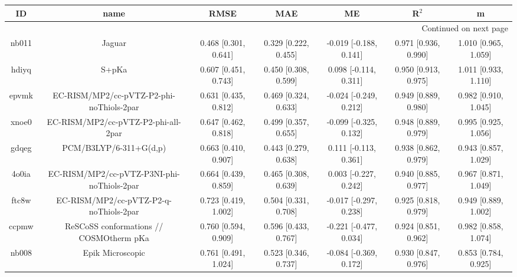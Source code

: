 \documentclass{article}
\begin{document}
\begin{center}
\begin{longtable}{|ccccccc|}
\toprule
    ID &                                               name &                  RMSE &                   MAE &                       ME &                 R$^2$ &                      m \\
\midrule
\endhead
\midrule
\multicolumn{7}{r}{{Continued on next page}} \\
\midrule
\endfoot

\bottomrule
\endlastfoot
 nb011 &                                             Jaguar &  0.468 [0.301, 0.641] &  0.329 [0.222, 0.455] &   -0.019 [-0.188, 0.141] &  0.971 [0.936, 0.990] &   1.010 [0.965, 1.059] \\
 hdiyq &                                              S+pKa &  0.607 [0.451, 0.743] &  0.450 [0.308, 0.599] &    0.098 [-0.114, 0.311] &  0.950 [0.913, 0.975] &   1.011 [0.933, 1.110] \\
 epvmk &           EC-RISM/MP2/cc-pVTZ-P2-phi-noThiols-2par &  0.631 [0.435, 0.812] &  0.469 [0.324, 0.633] &   -0.024 [-0.249, 0.212] &  0.949 [0.889, 0.980] &   0.982 [0.910, 1.045] \\
 xnoe0 &                EC-RISM/MP2/cc-pVTZ-P2-phi-all-2par &  0.647 [0.462, 0.818] &  0.499 [0.357, 0.655] &   -0.099 [-0.325, 0.132] &  0.948 [0.889, 0.979] &   0.995 [0.925, 1.056] \\
 gdqeg &                             PCM/B3LYP/6-311+G(d,p) &  0.663 [0.410, 0.907] &  0.443 [0.279, 0.638] &    0.111 [-0.113, 0.361] &  0.938 [0.862, 0.979] &   0.943 [0.857, 1.029] \\
 4o0ia &         EC-RISM/MP2/cc-pVTZ-P3NI-phi-noThiols-2par &  0.664 [0.439, 0.859] &  0.465 [0.308, 0.639] &    0.003 [-0.227, 0.242] &  0.940 [0.885, 0.977] &   0.967 [0.871, 1.049] \\
 ftc8w &             EC-RISM/MP2/cc-pVTZ-P2-q-noThiols-2par &  0.723 [0.419, 1.002] &  0.504 [0.331, 0.708] &   -0.017 [-0.297, 0.238] &  0.925 [0.818, 0.979] &   0.949 [0.889, 1.002] \\
 ccpmw &            ReSCoSS conformations // COSMOtherm pKa &  0.760 [0.594, 0.909] &  0.596 [0.433, 0.767] &   -0.221 [-0.477, 0.034] &  0.924 [0.851, 0.962] &   0.982 [0.858, 1.074] \\
 nb008 &                                   Epik Microscopic &  0.761 [0.491, 1.024] &  0.523 [0.346, 0.737] &   -0.084 [-0.369, 0.172] &  0.930 [0.847, 0.976] &   0.853 [0.784, 0.925] \\

\end{longtable}
\end{center}
\end{document}
